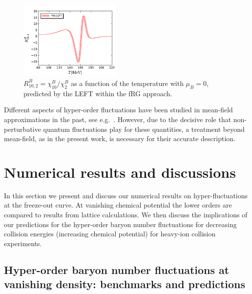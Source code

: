 \documentclass[%
reprint,
superscriptaddress,
showpacs,preprintnumbers,
amsmath,amssymb,
aps,
prd,
]{revtex4-1}
\begin{document}
%
\begin{figure}[b]
\includegraphics[width=0.45\textwidth]{R102-T-muB0}
\caption{$R^{B}_{10,2}=\chi^{B}_{10}/\chi^{B}_{2}$ as a function of the temperature with $\mu_B=0$, predicted by the LEFT within the fRG approach.}\label{fig:R102-T-muB0}
\end{figure}
%

Different aspects of hyper-order fluctuations have been studied in mean-field approximations in the past, see e.g.\ \cite{Wagner:2009pm, Karsch:2010hm, Schaefer:2011ex}. However, due to the decisive role that non-perturbative quantum fluctuations play for these quantities, a treatment beyond mean-field, as in the present work, is necessary for their accurate description.

	
\section{Numerical results and discussions}
\label{sec:num}

In this section we present and discuss our numerical results on hyper-fluctuations at the freeze-out curve. At vanishing chemical potential the lower orders are compared to results from lattice calculations. We then discuss the implications of our predictions for the hyper-order baryon number fluctuations for decreasing collision energies (increasing chemical potential)  for heavy-ion collision experiments. 
	

	
\subsection{Hyper-order baryon number fluctuations at vanishing density: benchmarks and predictions}
\label{subsec:hyper-order0}
	
\end{document}
